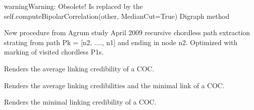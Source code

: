 \documentclass[letterpaper,10pt,english]{sphinxmanual}
\begin{document}
\begin{fulllineitems}
\begin{fulllineitems}
\begin{notice}{warning}{Warning:}
Obsolete! Is replaced by the self.computeBipolarCorrelation(other, MedianCut=True) Digraph method
\end{notice}

\end{fulllineitems}


\begin{fulllineitems}
\label{techDoc:digraphs.Digraph.chordlessPaths}
New procedure from Agrum study April 2009
recursive chordless path extraction strating from path
Pk = {[}n2, ...., n1{]} and ending in node n2.
Optimized with marking of visited chordless P1s.

\end{fulllineitems}


\begin{fulllineitems}
\label{techDoc:digraphs.Digraph.circuitAverageCredibility}
Renders the average linking credibility of a COC.

\end{fulllineitems}


\begin{fulllineitems}
\label{techDoc:digraphs.Digraph.circuitCredibilities}
Renders the average linking credibilities and the minimal link of a COC.

\end{fulllineitems}


\begin{fulllineitems}
\label{techDoc:digraphs.Digraph.circuitMaxCredibility}
Renders the minimal linking credibility of a COC.

\end{fulllineitems}



\end{fulllineitems}
\end{document}
